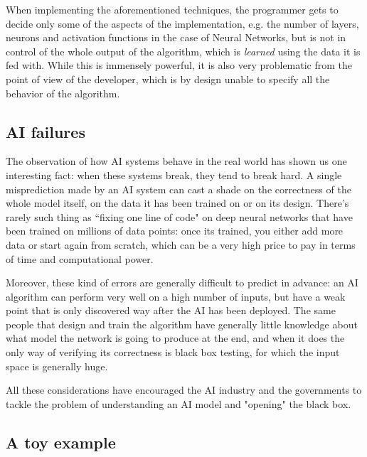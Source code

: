 \documentclass[conference]{IEEEtran}
\begin{document}
When implementing the aforementioned techniques, the programmer gets to decide
only some of the aspects of the implementation, e.g. the number of layers, neurons and
activation functions in the case of Neural Networks, but is not in control of
the whole output of the algorithm, which is \textit{learned} using the data it
is fed with. While this is immensely powerful, it is also very problematic from
the point of view of the developer, which is by design unable to specify all the behavior of the algorithm.

\subsection{AI failures}
\label{sec:aifails}

The observation of how AI systems behave in the real world has shown us one
interesting fact: when these systems break, they tend to break hard. A single
misprediction made by an AI system can cast a
shade on the correctness of the whole model itself, on the data it has been
trained on or on its design. There's rarely such thing as ``fixing one line of
code" on deep neural networks that have been trained on millions of data points:
once its trained, you either add more data or start again from scratch, which
can be a very high price to pay in terms of time and computational power.


Moreover, these kind of errors are generally difficult to predict in advance: an
AI algorithm can perform very well on a high number of inputs, but have a weak
point that is only discovered way after the AI has been deployed. The same
people that design and train the algorithm have generally little knowledge about
what model the network is going to produce at the end, and when it does the only
way of verifying its correctness is black box testing, for which the input space
is generally huge.

All these considerations have encouraged the AI industry and the governments to
tackle the problem of understanding an AI model and "opening" the black box.

\subsection{A toy example}
\label{sec:example}
\end{document}
